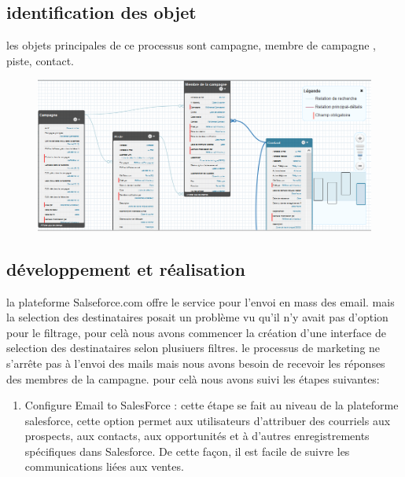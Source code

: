 \documentclass[a4paper, 12pt]{report}
\begin{document}
\begin{itemize}
\subsection{identification des objet}
les objets principales de ce processus sont campagne, membre de campagne , piste, contact.
\begin{figure}[H]
	\centering
		\includegraphics[scale=0.6]{classmarketing.PNG}
	\label{fig:le schéma des objets du processus de marketing}
\end{figure}

\subsection{développement et réalisation}
la plateforme Salseforce.com offre le service pour l'envoi en mass des email. mais la selection des destinataires posait un problème  vu qu'il n'y avait pas d'option pour le filtrage, pour celà nous avons commencer la création  d'une interface de selection des destinataires selon plusiuers filtres.
le processus de marketing ne s'arrête pas à l'envoi des mails mais nous avons besoin de recevoir les réponses des membres de la campagne.  pour celà nous avons suivi les étapes suivantes:
\begin{enumerate}
	\item Configure Email to SalesForce : cette étape se fait au niveau de la plateforme salesforce, cette option permet aux utilisateurs d'attribuer des courriels aux prospects, aux contacts, aux opportunités et à d'autres enregistrements spécifiques dans Salesforce. De cette façon, il est facile de suivre les communications liées aux ventes.
	

\end{enumerate}
\end{itemize}
\end{document}
